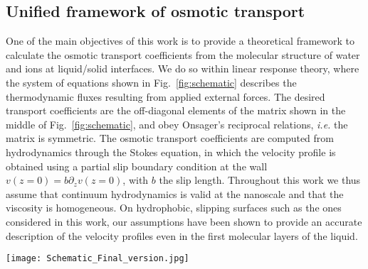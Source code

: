 \documentclass[journal=ancac3,manuscript=article,layout=twocolumn]{achemso}
\begin{document}
\subsection{Unified framework of osmotic transport}
One of the main objectives of this work is to provide a theoretical
framework to calculate the osmotic transport coefficients
from the molecular structure of water and ions at liquid/solid interfaces.
We do so within linear response theory, where the
system of equations shown in Fig.~\ref{fig:schematic}
describes the thermodynamic fluxes resulting from applied external forces.
The desired transport coefficients
are the off-diagonal elements of the matrix
shown in the middle of Fig.~\ref{fig:schematic},
and obey Onsager's reciprocal relations\cite{Onsager1931a,Onsager1931b},
\textit{i.e.} the matrix is symmetric.
The osmotic transport coefficients
are computed from  hydrodynamics through
the Stokes equation, in which
the velocity profile is obtained
using a partial slip boundary condition at the wall $v(z=0) = b \partial _z v(z=0)$, with $b$
the slip length\cite{Bocquet2007}.
Throughout this work we thus assume
that continuum hydrodynamics
is valid at the nanoscale and
that the viscosity is homogeneous.
On hydrophobic, slipping surfaces such as the ones considered in this work, our assumptions have been shown to provide an accurate description of the velocity profiles even in the first molecular layers of the liquid.\cite{Bonthuis2013}

\begin{figure*}[thb!]
\texttt{[image: Schematic\_Final\_version.jpg]}
\caption{\label{fig:schematic}
Schematic of the linear system of equations for osmotic transport.
The off-diagonal elements of Onsager
transport matrix represent the osmotic transport
coefficients, and are the central
quantities obtained in this work. They are computed
from the linear response of the fluxes,
(vector schematically shown on the left)
to an applied external force (vector on the right).
The matrix elements are color-coded according
to the color labeling of the respective flux, i.e., blue, violet and pink for
the elements due to a volumetric flow rate $Q$, an
excess solute flux $\delta J_s$ and an electrical current $I_e$, respectively.
From top to bottom, the external force vector on the right labels a pressure
gradient, a concentration gradient and an electrostatic potential gradient.
The sheets schematically depict a slit geometry, with cations and anions shown in
blue and red. Schematic inspired from Ref.~. }
\end{figure*}
\end{document}
